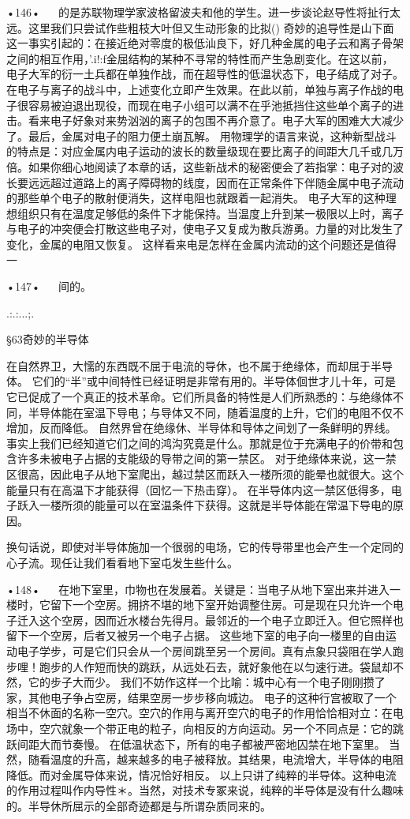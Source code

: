 {•146•
  
的是苏联物理学家波格留波夫和他的学生。进一步谈论赵导性将扯行太远。这里我们只尝试作些粗枝大叶但又生动形象的比拟()
奇妙的追导性是山下面这一事实引起的：在接近绝对零度的极低汕良下，好几种金属的电子云和离子骨架之间的相互作用，'.i!:f金屈结构的某种不寻常的特性而产生急剧变化。在这以前，电子大军的衍一土兵都在单独作战，而在超导性的低温状态下，电子结成了对子。
在电子与离子的战斗中，上述变化立即产生效果。在此以前，单独与离子作战的电子很容易被迫退出现役，而现在电子小组可以满不在乎池抵挡住这些单个离子的进击。看来电子好象对来势汹汹的离子的包围不再介意了。电子大军的困难大大减少了。最后，金属对电子的阻力便土崩瓦解。
用物理学的语言来说，这种新型战斗的特点是：对应金属内电子运动的波长的数量级现在要比离子的间距大几千或几万倍。如果你细心地阅读了本章的话，这些新战术的秘密便会了若指掌：电子对的波长要远远超过道路上的离子障碍物的线度，因而在正常条件下伴随金属中电子流动的那些单个电子的散射便消失，这样电阻也就跟着一起消失。
电子大军的这种理想组织只有在温度足够低的条件下才能保持。当温度上升到某一极限以上时，离子与电子的冲突便会打散这些电子对，使电子又复成为散兵游勇。力量的对比发生了变化，金属的电阻又恢复。
这样看来电是怎样在金属内流动的这个问题还是值得一

•147•
  
间的。
 

.:.:...;.
 

§63奇妙的半导体

 
在自然界卫，大懦的东西既不屈于电流的导休，也不属于绝缘体，而却屈于半导体。
它们的“半”或中间特性已经证明是非常有用的。半导体佪世才儿十年，可是它已促成了一个真正的技术革命。它们所具备的特性是人们所熟悉的：与绝缘体不同，半导体能在室温下导电；与导体又不同，随着温度的上升，它们的电阻不仅不增加，反而降低。
自然界曾在绝缘休、半导体和导体之间划了一条鲜明的界线。事实上我们已经知道它们之间的鸿沟究竟是什么。那就是位于充满电子的价带和包含许多未被电子占据的支能级的导带之间的第一禁区。
对于绝缘体来说，这一禁区很高，因此电子从地下室爬出，越过禁区而跃入一楼所须的能晕也就很大。这个能量只有在高温下才能获得（回忆一下热击穿）。
在半导体内这一禁区低得多，电子跃入一楼所须的能量可以在室温条件下获得。这就是半导体能在常温下导电的原因。

换句话说，即使对半导体施加一个很弱的电场，它的传导带里也会产生一个定同的心子流。现任让我们看看地下室屯发生些什么。

•148•
  
在地下室里，巾物也在发展着。关键是：当电子从地下室出来并进入一楼时，它留下一个空房。拥挤不堪的地下室开始调整住房。可是现在只允许一个电子迁入这个空房，因而近水楼台先得月。最邻近的一个电子立即迁入。但它照样也留下一个空房，后者又被另一个电子占据。
这些地下室的电子向一楼里的自由运动电子学步，可是它们只会从一个房间跳至另一个房间。真有点象只袋阻在学人跑步哩！跑步的人作短而快的跳跃，从远处石去，就好象他在以匀速行进。袋鼠却不然，它的步子大而少。
我们不妨作这样一个比喻：城中心有一个电子刚刚攒了家，其他电子争占空房，结果空房一步步移向城边。
电子的这种行宫被取了一个相当不休面的名称一空穴。空穴的作用与离开空穴的电子的作用恰恰相对立：在电场中，空穴就象一个带正电的粒子，向相反的方向运动。另一个不同点是：它的跳跃间距大而节奏慢。
在低温状态下，所有的电子都被严密地囚禁在地下室里。
当然，随看温度的升高，越来越多的电子被释放。其结果，电流增大，半导体的电阻降低。而对金属导体来说，情况恰好相反。
以上只讲了纯粹的半导体。这种电流的作用过程叫作内导性＊。当然，对技术专冢来说，纯粹的半导体是没有什么趣味的。半导休所屈示的全部奇迹都是与所谓杂质同来的。

}
